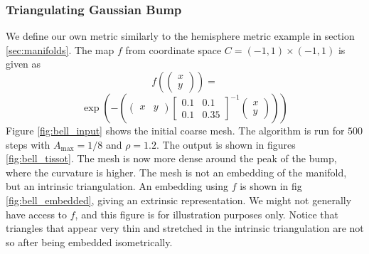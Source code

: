 \subsubsection*{Triangulating Gaussian Bump}
We define our own metric similarly to the hemisphere metric example in section \ref{sec:manifolds}.
The map $f$ from coordinate space $C = (-1, 1) \times (-1, 1)$ is given as 
$$f(\begin{pmatrix}
    x \\ y
\end{pmatrix}) = $$
$$\exp\left(-\left(\begin{pmatrix}
    x & y
\end{pmatrix} \begin{bmatrix} 0.1 & 0.1 \\ 0.1 & 0.35 \end{bmatrix}^{-\!1} \begin{pmatrix}
    x \\ y
\end{pmatrix}\right)\right)$$
Figure \ref{fig:bell_input} shows the initial coarse mesh. The algorithm is run for $500$ steps with $A_{\text{max}} = 1/8$ and $\rho = 1.2$. The output is shown in figures \ref{fig:bell_tissot}. The mesh is now more dense around the peak of the bump, where the curvature is higher. The mesh is not an embedding of the manifold, but an intrinsic triangulation. An embedding using $f$ is shown in fig \ref{fig:bell_embedded}, giving an extrinsic representation. We might not generally have access to $f$, and this figure is for illustration purposes only. Notice that triangles that appear very thin and stretched in the intrinsic triangulation are not so after being embedded isometrically.
